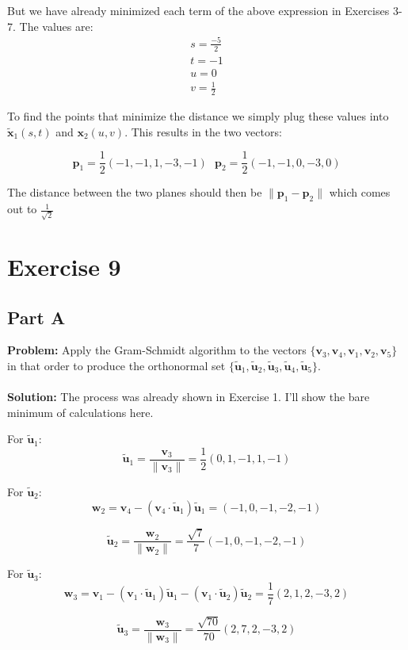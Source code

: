 \documentclass{article}
\begin{document}
But we have already minimized each term of the above expression in Exercises 3-7. The values are:
\begin{gather*}
  s=\frac{-5}{2}\\
  t=-1\\
  u=0\\
  v=\frac{1}{2}
\end{gather*}

To find the points that minimize the distance we simply plug these values into $\tilde{\mathbf x}_1(s,t)$ and $\mathbf x_2(u,v)$. This results in the two vectors:

$$\mathbf p_1=\frac{1}{2}(-1,-1,1,-3,-1)\ \ \ \mathbf p_2=\frac{1}{2}(-1,-1,0,-3,0)$$

The distance between the two planes should then be $\|\mathbf p_1-\mathbf p_2\|$ which comes out to $\frac{1}{\sqrt 2}$



\section*{Exercise 9}
\subsection*{Part A}
\textbf{Problem:} Apply the Gram-Schmidt algorithm to the vectors $\{\mathbf v_3, \mathbf v_4, \mathbf v_1, \mathbf v_2, \mathbf v_5\}$ in that order to produce the orthonormal set $\{\tilde{\mathbf u}_1, \tilde{\mathbf u}_2, \tilde{\mathbf u}_3, \tilde{\mathbf u}_4, \tilde{\mathbf u}_5\}$.
\\\\
\textbf{Solution:} The process was already shown in Exercise 1. I'll show the bare minimum of calculations here.

For $\tilde{\mathbf u}_1$:
$$\tilde{\mathbf u}_1=\frac{\mathbf v_3}{\|\mathbf v_3\|}=\frac{1}{2}(0,1,-1,1,-1)$$

For $\tilde{\mathbf u}_2$:
$$\mathbf w_2=\mathbf v_4-(\mathbf v_4\cdot\tilde{\mathbf u}_1)\tilde{\mathbf u}_1=(-1,0,-1,-2,-1)$$

$$\tilde{\mathbf u}_2=\frac{\mathbf w_2}{\|\mathbf w_2\|}=\frac{\sqrt 7}{7}(-1,0,-1,-2,-1)$$

For $\tilde{\mathbf u}_3$:
$$\mathbf w_3=\mathbf v_1-(\mathbf v_1\cdot\tilde{\mathbf u}_1)\tilde{\mathbf u}_1-(\mathbf v_1\cdot\tilde{\mathbf u}_2)\tilde{\mathbf u}_2=\frac{1}{7}(2,1,2,-3,2)$$

$$\tilde{\mathbf u}_3=\frac{\mathbf w_3}{\|\mathbf w_3\|}=\frac{\sqrt{70}}{70}(2,7,2,-3,2)$$
\end{document}
